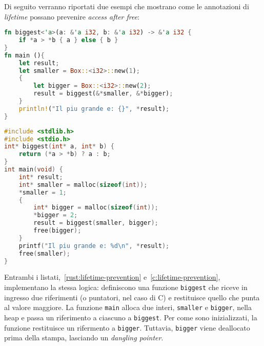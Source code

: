 Di seguito verranno riportati due esempi che mostrano come le annotazioni di \textit{lifetime} possano prevenire \textit{access after free}:
\begin{lstlisting}[language=Rust, caption={Prevenzione di \textit{access after free} tramite \textit{lifetime annotations}}, label={rust:lifetime-prevention}]
fn biggest<'a>(a: &'a i32, b: &'a i32) -> &'a i32 {
    if *a > *b { a } else { b }
}
fn main (){
    let result;
    let smaller = Box::<i32>::new(1);
    {
        let bigger = Box::<i32>::new(2);
        result = biggest(&*smaller, &*bigger);
    }
    println!("Il piu grande e: {}", *result);
}
\end{lstlisting}
\begin{lstlisting}[language=C, caption={\textit{Access after free} dovuta alla mancanza di \textit{lifetime} in C}, label={c:lifetime-prevention}]
#include <stdlib.h>
#include <stdio.h>
int* biggest(int* a, int* b) {
    return (*a > *b) ? a : b;
}
int main(void) {
    int* result;
    int* smaller = malloc(sizeof(int));
    *smaller = 1;
    {
        int* bigger = malloc(sizeof(int));
        *bigger = 2;
        result = biggest(smaller, bigger);
        free(bigger);
    }
    printf("Il piu grande e: %d\n", *result);
    free(smaller);
}
\end{lstlisting}
Entrambi i listati,~\ref{rust:lifetime-prevention} e~\ref{c:lifetime-prevention}, implementano la stessa logica: definiscono una funzione \texttt{biggest} che
riceve in ingresso due riferimenti (o puntatori, nel caso di C) e restituisce quello che punta al valore maggiore.
La funzione \texttt{main} alloca due interi, \texttt{smaller} e \texttt{bigger}, nella heap e passa un riferimento a ciascuno a 
\texttt{biggest}.
Per come sono inizializzati, la funzione restituisce un rifermento a \texttt{bigger}. Tuttavia, \texttt{bigger} viene deallocato prima della stampa, lasciando un \textit{dangling pointer}.

